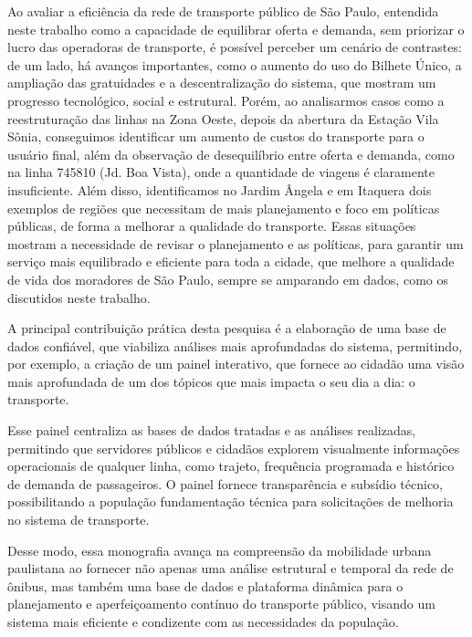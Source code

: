 Ao avaliar a eficiência da rede de transporte público de São Paulo, entendida neste trabalho como a capacidade de equilibrar oferta e demanda, sem priorizar o lucro das operadoras de transporte, é possível perceber um cenário de contrastes: de um lado, há avanços importantes, como o aumento do uso do Bilhete Único, a ampliação das gratuidades e a descentralização do sistema, que mostram um progresso tecnológico, social e estrutural. Porém, ao analisarmos casos como a reestruturação das linhas na Zona Oeste, depois da abertura da Estação Vila Sônia, conseguimos identificar um aumento de custos do transporte para o usuário final, além da observação de desequilíbrio entre oferta e demanda, como na linha 745810 (Jd. Boa Vista), onde a quantidade de viagens é claramente insuficiente. Além disso, identificamos no Jardim Ângela e em Itaquera dois exemplos de regiões que necessitam de mais planejamento e foco em políticas públicas, de forma a melhorar a qualidade do transporte. Essas situações mostram a necessidade de revisar o planejamento e as políticas, para garantir um serviço mais equilibrado e eficiente para toda a cidade, que melhore a qualidade de vida dos moradores de São Paulo, sempre se amparando em dados, como os discutidos neste trabalho.

A principal contribuição prática desta pesquisa é a elaboração de uma base de dados confiável, que viabiliza análises mais aprofundadas do sistema, permitindo, por exemplo, a criação de um painel interativo, que fornece ao cidadão uma visão mais aprofundada de um dos tópicos que mais impacta o seu dia a dia: o transporte. 

Esse painel centraliza as bases de dados tratadas e as análises realizadas, permitindo que servidores públicos e cidadãos explorem visualmente informações operacionais de qualquer linha, como trajeto, frequência programada e histórico de demanda de passageiros. O painel fornece transparência e subsídio técnico, possibilitando a população fundamentação técnica para solicitações de melhoria no sistema de transporte.

Desse modo, essa monografia avança na compreensão da mobilidade urbana paulistana ao fornecer não apenas uma análise estrutural e temporal da rede de ônibus, mas também uma base de dados e plataforma dinâmica para o planejamento e aperfeiçoamento contínuo do transporte público, visando um sistema mais eficiente e condizente com as necessidades da população.